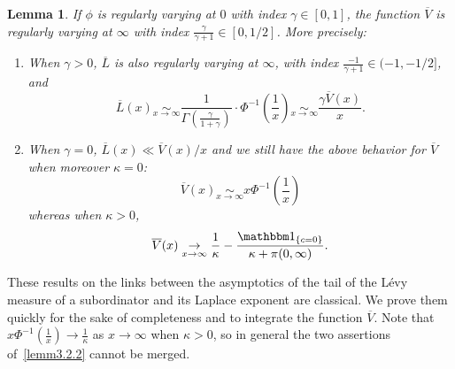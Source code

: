 \documentclass[10pt]{amsart}
\newtheorem{lemm}[theo]{Lemma}
\theoremstyle{definition}
\numberwithin{equation}{section}
\renewcommand{\bar}[1]{\overline{#1}}
\newcommand*{\relabel}{\renewcommand{\labelenumi}{(\theenumi)}}
\newcommand*{\romanenumi}{\renewcommand*{\theenumi}{\roman{enumi}}\relabel}
\begin{document}
\begin{lemm}\label{lem:varVL}
If $\phi$ is regularly varying at $0$ with index $\gamma \in [0,1]$, the function $\bar V$ is regularly varying at $\infty$ with index $\frac{\gamma}{\gamma+1} \in [0,1/2]$. More precisely:
\begin{enumerate}\romanenumi
\item\label{lemm3.2.1} When $\gamma>0$, $\bar L$ is also regularly varying at $\infty$, with index $\frac{-1}{\gamma+1} \in (-1,-1/2]$, and
\[
\bar L(x) \underset{x \rightarrow \infty}{\sim} \frac{1}{\Gamma\left(\frac{\gamma}{1+\gamma}\right)} \cdot \Phi^{-1}\left(\frac{1}{x}\right) \underset{x \rightarrow \infty}{\sim} \frac{\gamma \bar V(x)}{x}.
\]
\item\label{lemm3.2.2} When $\gamma=0$, $\bar L(x) \ll \bar V(x)/x$ and we still have the above behavior for $\bar V$ when moreover $\kappa=0$:
\[
\bar V(x) \underset{x \rightarrow \infty}{\sim} x \Phi^{-1}\left(\frac{1}{x}\right)
\]
whereas when $\kappa>0$,
\[
\bar V(x) \underset{x \rightarrow \infty}{\rightarrow} \frac{1}{\kappa}- \frac{\mathbbm 1_{\{c=0\}}}{\kappa +\pi(0,\infty)}.
\]
\end{enumerate}
\end{lemm}

These results on the links between the asymptotics of the tail of the Lévy measure of a subordinator and its Laplace exponent are classical. We prove them quickly for the sake of completeness and to integrate the function $\bar V$. Note that $x \Phi^{-1}\left(\frac{1}{x}\right) \rightarrow \frac{1}{\kappa}$ as $x \rightarrow \infty$ when $\kappa>0$, so in general the two assertions of~\eqref{lemm3.2.2} cannot be merged.
\end{document}
